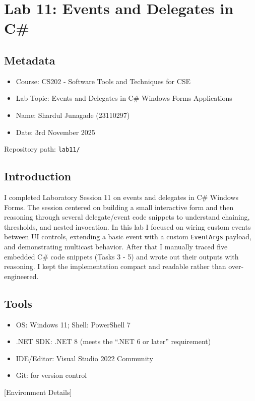 \section{Lab 11: Events and Delegates in C\#}

\subsection*{Metadata}
\begin{itemize}
	\item Course: CS202 - Software Tools and Techniques for CSE
	\item Lab Topic: Events and Delegates in C\# Windows Forms Applications
	\item Name: Shardul Junagade (23110297)
	\item Date: 3rd November 2025
\end{itemize}

Repository path: \texttt{lab11/}

\subsection{Introduction}
I completed Laboratory Session 11 on events and delegates in C\# Windows Forms. The session centered on building a small interactive form and then reasoning through several delegate/event code snippets to understand chaining, thresholds, and nested invocation. In this lab I focused on wiring custom events between UI controls, extending a basic event with a custom \texttt{EventArgs} payload, and demonstrating multicast behavior. After that I manually traced five embedded C\# code snippets (Tasks 3 - 5) and wrote out their outputs with reasoning. I kept the implementation compact and readable rather than over-engineered.

\subsection{Tools}
\begin{itemize}[itemsep=0pt]
	\item OS: Windows 11; Shell: PowerShell 7
	\item .NET SDK: .NET 8 (meets the ``.NET 6 or later'' requirement)
	\item IDE/Editor: Visual Studio 2022 Community
	\item Git: for version control
\end{itemize}

[Environment Details]

